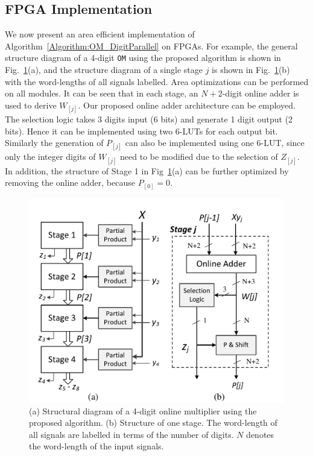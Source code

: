 \documentclass[conference]{IEEEtran}
\begin{document}
\subsection{FPGA Implementation}
We now present an area efficient implementation of Algorithm~\ref{Algorithm:OM_DigitParallel} on FPGAs. For example, the general structure diagram of a 4-digit \texttt{OM} using the proposed algorithm is shown in Fig.~\ref{Fig:PMStructure}(a), and the structure diagram of a single stage $j$ is shown in Fig.~\ref{Fig:PMStructure}(b) with the word-lengths of all signals labelled. Area optimizations can be performed on all modules. It can be seen that in each stage, an $N+2$-digit online adder is used to derive $W_{[j]}$. Our proposed online adder architecture can be employed. The selection logic takes 3 digits input (6 bits) and generate 1 digit output (2 bits). Hence it can be implemented using two 6-LUTs for each output bit. Similarly the generation of $P_{[j]}$ can also be implemented using one 6-LUT, since only the integer digits of $W_{[j]}$ need to be modified due to the selection of $Z_{[j]}$. In addition, the structure of Stage 1 in Fig~\ref{Fig:PMStructure}(a) can be further optimized by removing the online adder, because $P_{[0]}=0$.
%
\begin{figure}[tbp]
	\centering
	\includegraphics[width=.5\textwidth]{./Figures/ParallelMult_Structure.pdf}
	\caption{(a) Structural diagram of a 4-digit online multiplier using the proposed algorithm. (b) Structure of one stage. The word-length of all signals are labelled in terms of the number of digits. $N$ denotes the word-length of the input signals.}
	\label{Fig:PMStructure}
	\vspace{-1ex}
\end{figure}
\end{document}
